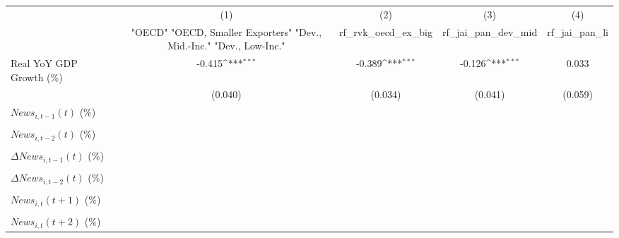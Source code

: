 {
\def\sym#1{\ifmmode^{#1}\else\(^{#1}\)\fi}
\begin{tabular}{l*{4}{c}}
\toprule
                    &\multicolumn{1}{c}{(1)}&\multicolumn{1}{c}{(2)}&\multicolumn{1}{c}{(3)}&\multicolumn{1}{c}{(4)}\\
                    &\multicolumn{1}{c}{ "OECD" "OECD, Smaller Exporters" "Dev., Mid.-Inc." "Dev., Low-Inc."}&\multicolumn{1}{c}{rf_rvk_oecd_ex_big}&\multicolumn{1}{c}{rf_jai_pan_dev_mid}&\multicolumn{1}{c}{rf_jai_pan_li}\\
\midrule
Real YoY GDP Growth (\%)&      -0.415\sym{***}&      -0.389\sym{***}&      -0.126\sym{***}&       0.033         \\
                    &     (0.040)         &     (0.034)         &     (0.041)         &     (0.059)         \\
\addlinespace
$ News_{i,t-1}(t)$ (\%)&                     &                     &                     &                     \\
                    &                     &                     &                     &                     \\
\addlinespace
$ News_{i,t-2}(t)$ (\%)&                     &                     &                     &                     \\
                    &                     &                     &                     &                     \\
\addlinespace
$ \Delta News_{i,t-1}(t)$ (\%)&                     &                     &                     &                     \\
                    &                     &                     &                     &                     \\
\addlinespace
$ \Delta News_{i,t-2}(t)$ (\%)&                     &                     &                     &                     \\
                    &                     &                     &                     &                     \\
\addlinespace
$ News_{i,t}(t+1)$ (\%)&                     &                     &                     &                     \\
                    &                     &                     &                     &                     \\
\addlinespace
$ News_{i,t}(t+2)$ (\%)&                     &                     &                     &                     \\

\end{tabular}}
